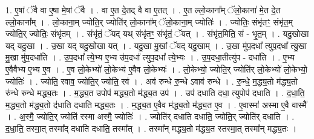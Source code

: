 \documentclass[17pt]{extarticle}
\begin{document}
1. ए॒षां ॅवै वा ए॒षा मे॒षां ॅवै । . वा ए॒त दे॒तद् वै वा ए॒तत् । . ए॒त ल्लो॒काना᳚म् ॅलो॒काना॑ मे॒त दे॒त ल्लो॒काना᳚म् । . लो॒काना॒म् ज्योति॒र् ज्योति॑र् लो॒काना᳚म् ॅलो॒काना॒म् ज्योतिः॑ । . ज्योतिः॒ संभृ॑तꣳ॒॒ संभृ॑त॒म् ज्योति॒र् ज्योतिः॒ संभृ॑तम् । . संभृ॑तं॒ ॅयद् यथ् संभृ॑तꣳ॒॒ संभृ॑तं॒ ॅयत् । . संभृ॑त॒मिति॒ सं - भृ॒त॒म् । . यदु॒खोखा यद् यदु॒खा । . उ॒खा यद् यदु॒खोखा यत् । . यदु॒खा मु॒खां ॅयद् यदु॒खाम् । . उ॒खा मु॑प॒दधा᳚ त्युप॒दधा᳚ त्यु॒खा मु॒खा मु॑प॒दधा॑ति । . उ॒प॒दधा᳚ त्ये॒भ्य ए॒भ्य उ॑प॒दधा᳚ त्युप॒दधा᳚ त्ये॒भ्यः । . उ॒प॒दधा॒तीत्यु॑प - दधा॑ति । . ए॒भ्य ए॒वैवैभ्य ए॒भ्य ए॒व । . ए॒व लो॒केभ्यो॑ लो॒केभ्य॑ ए॒वैव लो॒केभ्यः॑ । . लो॒केभ्यो॒ ज्योति॒र् ज्योति॑र् लो॒केभ्यो॑ लो॒केभ्यो॒ ज्योतिः॑ । . ज्योति॒ रवाव॒ ज्योति॒र् ज्योति॒ रव॑ । . अव॑ रुन्धे रु॒न्धे ऽवाव॑ रुन्धे । . रु॒न्धे॒ म॒द्ध्य॒तो म॑द्ध्य॒तो रु॑न्धे रुन्धे मद्ध्य॒तः । . म॒द्ध्य॒त उपोप॑ मद्ध्य॒तो म॑द्ध्य॒त उप॑ । . उप॑ दधाति दधा॒ त्युपोप॑ दधाति । . द॒धा॒ति॒ म॒द्ध्य॒तो म॑द्ध्य॒तो द॑धाति दधाति मद्ध्य॒तः । . म॒द्ध्य॒त ए॒वैव म॑द्ध्य॒तो म॑द्ध्य॒त ए॒व । . ए॒वास्मा॑ अस्मा ए॒वै वास्मै᳚ । . अ॒स्मै॒ ज्योति॒र् ज्योति॑ रस्मा अस्मै॒ ज्योतिः॑ । . ज्योति॑र् दधाति दधाति॒ ज्योति॒र् ज्योति॑र् दधाति । . द॒धा॒ति॒ तस्मा॒त् तस्मा᳚द् दधाति दधाति॒ तस्मा᳚त् । . तस्मा᳚न् मद्ध्य॒तो म॑द्ध्य॒त स्तस्मा॒त् तस्मा᳚न् मद्ध्य॒तः । \newline
\end{document}

